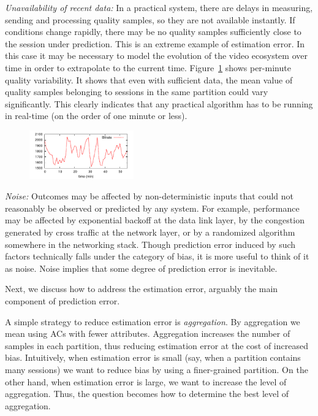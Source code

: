 \begin{packedenumerate}
\item \emph{Unavailability of recent data:} In a practical system,
  there are delays in measuring, sending and processing quality
  samples, so they are not available instantly.  If conditions change
  rapidly, there may be no quality samples sufficiently close to the
  session under prediction.  This is an extreme example of estimation
  error.  In this case it may be necessary to model the evolution of
  the video ecosystem over time in order to extrapolate to the current
  time. Figure~\ref{fig:quality-variability} shows per-minute quality
  variability. It shows that even with sufficient data, the mean value
  of quality samples belonging to sessions in the same partition could
  vary significantly. This clearly indicates that any practical
  algorithm has to be running in real-time (on the order of one minute
  or less).

\begin{figure}[h!]
\centering
 \includegraphics[width=0.4\textwidth] {figures/quality-time.pdf}
\label{fig:quality-variability}
\end{figure}

\item \emph{Noise:} Outcomes may be affected by non-deterministic inputs that could not reasonably be observed or predicted by any system.  For
  example, performance may be affected by exponential backoff at the
  data link layer, by the congestion generated by cross traffic at the
  network layer, or by a randomized algorithm somewhere in the networking stack.  Though prediction error induced by such factors technically falls under the category of bias, it is more useful to think of it as noise.  Noise implies that some degree of prediction error is
  inevitable.
\end{packedenumerate}

Next, we discuss how to address the estimation
error, arguably the main component of prediction error.

\label{subsec:aggregation}
A simple strategy to reduce estimation error is {\it aggregation}.  By
aggregation we mean using ACs with fewer attributes.  Aggregation
increases the number of samples in each partition, thus reducing
estimation error at the cost of increased bias.  Intuitively, when
estimation error is small (say, when a partition contains
many sessions) we want to reduce bias by using a finer-grained
partition.  On the other hand, when estimation error is large, we want
to increase the level of aggregation.  Thus, the question becomes how
to determine the best level of aggregation.


